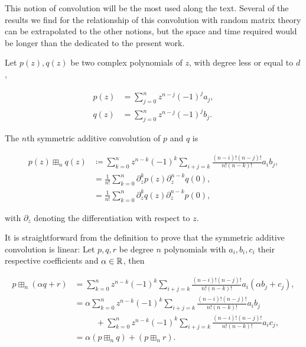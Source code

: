 This notion of convolution will be the most used along the text. Several of the results we find for the relationship of this convolution with random matrix theory can be extrapolated to the other notions, but the space and time required would be longer than the dedicated to the present work.

\begin{definition}\label{def:symadconv}
    Let $p(z), q(z)$ be two complex polynomials of $z$, with degree less or equal to $d$,

    \begin{align*}
        p(z) &= \sum_{j=0}^n z^{n-j}(-1)^{j}a_j,\\
        q(z) &= \sum_{j=0}^n z^{n-j}(-1)^{j}b_j.
    \end{align*}

    The $n$th symmetric additive convolution of $p$ and $q$ is

    \begin{align*}
        p(z) \boxplus_n q(z) &\coloneqq \sum_{k=0}^n z^{n-k}(-1)^k \sum_{i+j = k} \frac{(n-i)!(n-j)!}{n!(n-k)!}a_i b_j, \\
        &= \frac{1}{n!}\sum_{k=0}^n \partial_z^k p(z)\partial_z^{n-k}q(0),\\
        &= \frac{1}{n!}\sum_{k=0}^n \partial_z^k q(z)\partial_z^{n-k}p(0),
    \end{align*}

    \noindent with $\partial_z$ denoting the differentiation with respect to $z$.
\end{definition}

It is straightforward from the definition to prove that the symmetric additive convolution is linear: Let $p,q,r$ be degree $n$ polynomials with $a_i, b_i, c_i$ their respective coefficients and $\alpha \in \mathbb R$, then

\begin{align*}
    p \boxplus_n (\alpha q + r) &= \sum_{k=0}^n z^{n-k}(-1)^k \sum_{i+j = k} \frac{(n-i)!(n-j)!}{n!(n-k)!}a_i (\alpha b_j + c_j), \\ 
    &= \alpha \sum_{k=0}^n z^{n-k}(-1)^k \sum_{i+j = k} \frac{(n-i)!(n-j)!}{n!(n-k)!}a_i b_j\\ 
    &\phantom{unpoc} +\sum_{k=0}^n z^{n-k}(-1)^k \sum_{i+j = k} \frac{(n-i)!(n-j)!}{n!(n-k)!}a_i c_j,\\
    &= \alpha(p \boxplus_n q) + (p \boxplus_n r).
\end{align*}




